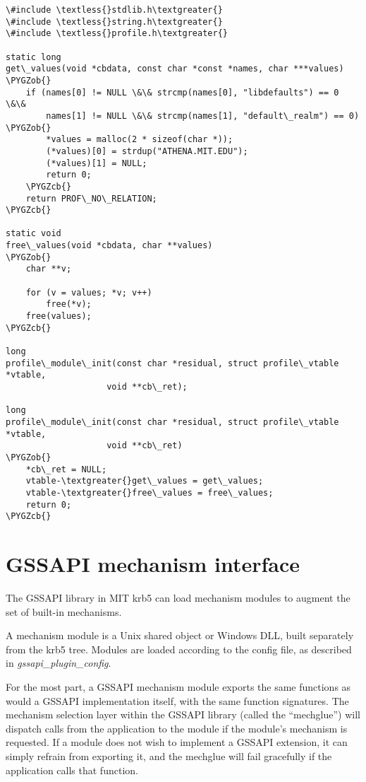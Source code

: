 \documentclass[letterpaper,10pt,english]{sphinxmanual}
\def\PYGZob{\char`\{}
\def\PYGZcb{\char`\}}
\begin{document}
\begin{Verbatim}[commandchars=\\\{\}]
\#include \textless{}stdlib.h\textgreater{}
\#include \textless{}string.h\textgreater{}
\#include \textless{}profile.h\textgreater{}

static long
get\_values(void *cbdata, const char *const *names, char ***values)
\PYGZob{}
    if (names[0] != NULL \&\& strcmp(names[0], "libdefaults") == 0 \&\&
        names[1] != NULL \&\& strcmp(names[1], "default\_realm") == 0) \PYGZob{}
        *values = malloc(2 * sizeof(char *));
        (*values)[0] = strdup("ATHENA.MIT.EDU");
        (*values)[1] = NULL;
        return 0;
    \PYGZcb{}
    return PROF\_NO\_RELATION;
\PYGZcb{}

static void
free\_values(void *cbdata, char **values)
\PYGZob{}
    char **v;

    for (v = values; *v; v++)
        free(*v);
    free(values);
\PYGZcb{}

long
profile\_module\_init(const char *residual, struct profile\_vtable *vtable,
                    void **cb\_ret);

long
profile\_module\_init(const char *residual, struct profile\_vtable *vtable,
                    void **cb\_ret)
\PYGZob{}
    *cb\_ret = NULL;
    vtable-\textgreater{}get\_values = get\_values;
    vtable-\textgreater{}free\_values = free\_values;
    return 0;
\PYGZcb{}
\end{Verbatim}


\section{GSSAPI mechanism interface}
\label{plugindev/gssapi::doc}\label{plugindev/gssapi:gssapi-mechanism-interface}
The GSSAPI library in MIT krb5 can load mechanism modules to augment
the set of built-in mechanisms.

A mechanism module is a Unix shared object or Windows DLL, built
separately from the krb5 tree.  Modules are loaded according to the
 config file, as described in
\emph{gssapi\_plugin\_config}.

For the most part, a GSSAPI mechanism module exports the same
functions as would a GSSAPI implementation itself, with the same
function signatures.  The mechanism selection layer within the GSSAPI
library (called the ``mechglue'') will dispatch calls from the
application to the module if the module's mechanism is requested.  If
a module does not wish to implement a GSSAPI extension, it can simply
refrain from exporting it, and the mechglue will fail gracefully if
the application calls that function.
\end{document}
